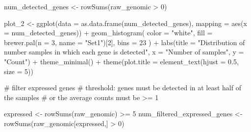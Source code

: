 \documentclass[
  letterpaper,
  DIV=11,
  numbers=noendperiod]{scrartcl}
\newenvironment{Shaded}{\begin{snugshade}}{\end{snugshade}}
\newcommand{\AttributeTok}[1]{\textcolor[rgb]{0.40,0.45,0.13}{#1}}
\newcommand{\CommentTok}[1]{\textcolor[rgb]{0.37,0.37,0.37}{#1}}
\newcommand{\DecValTok}[1]{\textcolor[rgb]{0.68,0.00,0.00}{#1}}
\newcommand{\FloatTok}[1]{\textcolor[rgb]{0.68,0.00,0.00}{#1}}
\newcommand{\FunctionTok}[1]{\textcolor[rgb]{0.28,0.35,0.67}{#1}}
\newcommand{\NormalTok}[1]{\textcolor[rgb]{0.00,0.23,0.31}{#1}}
\newcommand{\OtherTok}[1]{\textcolor[rgb]{0.00,0.23,0.31}{#1}}
\newcommand{\SpecialCharTok}[1]{\textcolor[rgb]{0.37,0.37,0.37}{#1}}
\newcommand{\StringTok}[1]{\textcolor[rgb]{0.13,0.47,0.30}{#1}}
\begin{document}
\begin{Shaded}
\begin{Highlighting}[]
\NormalTok{num\_detected\_genes }\OtherTok{\textless{}{-}} \FunctionTok{rowSums}\NormalTok{(raw\_genomic }\SpecialCharTok{\textgreater{}} \DecValTok{0}\NormalTok{)}

\NormalTok{plot\_2 }\OtherTok{\textless{}{-}} \FunctionTok{ggplot}\NormalTok{(}\AttributeTok{data =} \FunctionTok{as.data.frame}\NormalTok{(num\_detected\_genes), }\AttributeTok{mapping =}  \FunctionTok{aes}\NormalTok{(}\AttributeTok{x =}\NormalTok{ num\_detected\_genes)) }\SpecialCharTok{+}
  \FunctionTok{geom\_histogram}\NormalTok{(}
    \AttributeTok{color =} \StringTok{"white"}\NormalTok{,}
    \AttributeTok{fill =} \FunctionTok{brewer.pal}\NormalTok{(}\AttributeTok{n =} \DecValTok{3}\NormalTok{, }\AttributeTok{name =} \StringTok{"Set1"}\NormalTok{)[}\DecValTok{2}\NormalTok{],}
    \AttributeTok{bins =} \DecValTok{23}
\NormalTok{  ) }\SpecialCharTok{+}
  \FunctionTok{labs}\NormalTok{(}\AttributeTok{title =} \StringTok{"Distribution of number samples in which each gene is detected"}\NormalTok{,}
       \AttributeTok{x =} \StringTok{"Number of samples"}\NormalTok{,}
       \AttributeTok{y =} \StringTok{"Count"}\NormalTok{) }\SpecialCharTok{+}
  \FunctionTok{theme\_minimal}\NormalTok{() }\SpecialCharTok{+}
  \FunctionTok{theme}\NormalTok{(}\AttributeTok{plot.title =} \FunctionTok{element\_text}\NormalTok{(}\AttributeTok{hjust =} \FloatTok{0.5}\NormalTok{, }\AttributeTok{size =} \DecValTok{5}\NormalTok{))}


\CommentTok{\# filter expressed genes }
\CommentTok{\# threshold: genes must be detected in at least half of the samples}
\CommentTok{\#            or the average counts must be \textgreater{}= 1}

\NormalTok{expressed }\OtherTok{\textless{}{-}} \FunctionTok{rowSums}\NormalTok{(raw\_genomic) }\SpecialCharTok{\textgreater{}=} \DecValTok{5}
\NormalTok{num\_filtered\_expressed\_genes }\OtherTok{\textless{}{-}} \FunctionTok{rowSums}\NormalTok{(raw\_genomic[expressed,] }\SpecialCharTok{\textgreater{}} \DecValTok{0}\NormalTok{)}


\end{Highlighting}
\end{Shaded}
\end{document}
